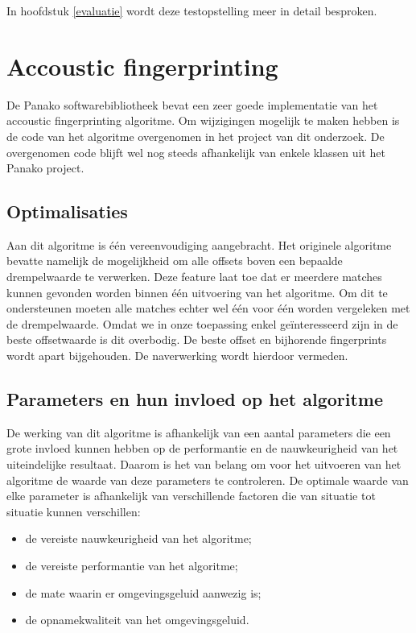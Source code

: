 In hoofdstuk \ref{evaluatie} wordt deze testopstelling meer in detail besproken.

\section{Accoustic fingerprinting}

De Panako softwarebibliotheek bevat een zeer goede implementatie van het accoustic fingerprinting algoritme. Om wijzigingen mogelijk te maken hebben is de code van het algoritme overgenomen in het project van dit onderzoek. De overgenomen code blijft wel nog steeds afhankelijk van enkele klassen uit het Panako project. 

\subsection{Optimalisaties}

Aan dit algoritme is één vereenvoudiging aangebracht. Het originele algoritme bevatte namelijk de mogelijkheid om alle offsets boven een bepaalde drempelwaarde te verwerken. Deze feature laat toe dat er meerdere matches kunnen gevonden worden binnen één uitvoering van het algoritme. Om dit te ondersteunen moeten alle matches echter wel één voor één worden vergeleken met de drempelwaarde. Omdat we in onze toepassing enkel geïnteresseerd zijn in de beste offsetwaarde is dit overbodig. De beste offset en bijhorende fingerprints wordt apart bijgehouden. De naverwerking wordt hierdoor vermeden.

\subsection{Parameters en hun invloed op het algoritme}
\label{accoustic-fingerprinting-params}

De werking van dit algoritme is afhankelijk van een aantal parameters die een grote invloed kunnen hebben op de performantie en de nauwkeurigheid van het uiteindelijke resultaat. Daarom is het van belang om voor het uitvoeren van het algoritme de waarde van deze parameters te controleren. De optimale waarde van elke parameter is afhankelijk van verschillende factoren die van situatie tot situatie kunnen verschillen:

\begin{itemize}[noitemsep]
\item de vereiste nauwkeurigheid van het algoritme;
\item de vereiste performantie van het algoritme;
\item de mate waarin er omgevingsgeluid aanwezig is;
\item de opnamekwaliteit van het omgevingsgeluid.
\end{itemize}

